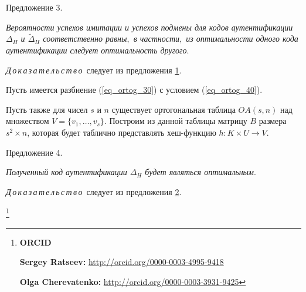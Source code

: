 \vskip 0.1in



{\small \sc Предложение 3.}

{\it Вероятности успехов имитации и успехов подмены для кодов аутентификации $\Delta_H$ и $\widetilde{\Delta}_H$ соответственно равны$,$ в частности$,$ из оптимальности одного кода аутентификации следует оптимальность другого$.$

}



{\it  Д\,о\,к\,а\,з\,а\,т\,е\,л\,ь\,с\,т\,в\,о\,} следует из предложения \hyperlink{rats:pr:1}{1}.



\vskip 0.1in



Пусть имеется разбиение (\ref{eq_ortog_30}) с условием (\ref{eq_ortog_40}).

Пусть также для чисел $s$ и $n$ существует ортогональная таблица $OA(s, n)$  над множеством $V=\{v_1,\dots ,v_s\}$. Построим из данной таблицы матрицу $B$ размера $s^2\times n$, которая будет таблично представлять хеш-функцию $h: K\times U \rightarrow V$.



\vskip 0.1in



{\small\sc Предложение 4.}

{\it Полученный код аутентификации $\Delta_H$ будет являться оптимальным$.$

}





{\it  Д\,о\,к\,а\,з\,а\,т\,е\,л\,ь\,с\,т\,в\,о\,} следует из предложения \hyperlink{rats:pr:2}{2}.





\thanks{{\bf ORCID}



{\bf Sergey Ratseev:} \url{http://orcid.org/0000-0003-4995-9418}



{\bf Olga Cherevatenko:} \url{http://orcid.org/0000-0003-3931-9425}

}















\RusRef





